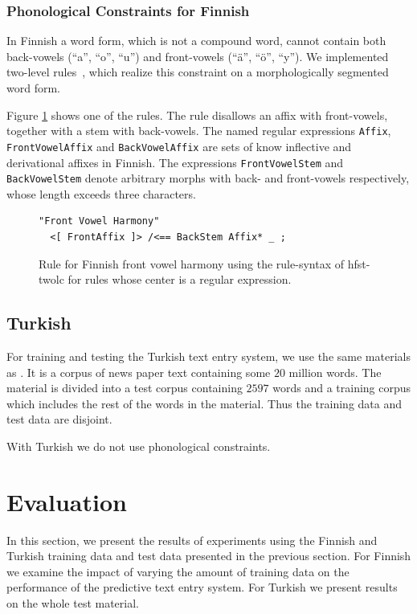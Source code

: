 \documentclass{llncs}
\begin{document}
\subsubsection{Phonological Constraints for Finnish}

In Finnish a word form, which is not a compound word, cannot contain
both back-vowels (``a'', ``o'', ``u'') and front-vowels (``ä'', ``ö'',
``y''). We implemented two-level rules~\cite{koskenniemi/1983}, which
realize this constraint on a morphologically segmented word form.

Figure \ref{fi-constraints} shows one of the rules. The rule disallows
an affix with front-vowels, together with a stem with back-vowels. The
named regular expressions \verb|Affix|, \verb|FrontVowelAffix| and
\verb|BackVowelAffix| are sets of know inflective and derivational affixes
in Finnish. The expressions \verb|FrontVowelStem| and \verb|BackVowelStem|
denote arbitrary morphs with back- and front-vowels respectively,
whose length exceeds three characters.

\begin{figure}
\begin{verbatim}
"Front Vowel Harmony"
  <[ FrontAffix ]> /<== BackStem Affix* _ ; 
\end{verbatim}
\caption{Rule for Finnish front vowel harmony using the rule-syntax of hfst-twolc for rules whose center is a regular expression.}\label{fi-constraints}
\end{figure}

\subsection{Turkish}

For training and testing the Turkish text entry system, we use the
same materials as \cite{Tantug:2010}. It is a corpus of news paper text
containing some $20$ million words. The material is divided into a
test corpus containing $2597$ words and a training corpus which
includes the rest of the words in the material. Thus the training data
and test data are disjoint.

With Turkish we do not use phonological constraints.

\section{Evaluation}\label{evaluation}

In this section, we present the results of experiments using the
Finnish and Turkish training data and test data presented in the
previous section. For Finnish we examine the impact of varying the
amount of training data on the performance of the predictive text
entry system. For Turkish we present results on the whole test
material.
\end{document}
